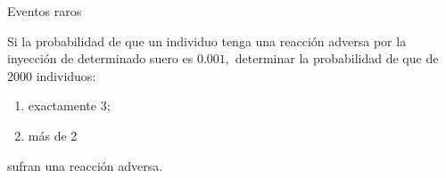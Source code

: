 


{Eventos raros}
\begin{ejemplo}
\label{sol:0.7.28}
  Si la probabilidad de que un individuo tenga una reacción adversa por la inyección de determinado suero es $0.001,$ determinar la probabilidad de que de 2000 individuos:
 \begin{enumerate}
  \item exactamente 3;
  \item más de 2
 \end{enumerate}
sufran una reacción adversa.
\end{ejemplo}





